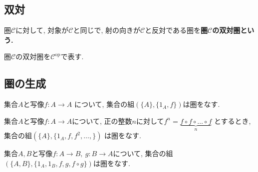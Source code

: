 \subsection{双対}
\begin{Def}
圏$\mathscr{C}$に対して, 対象が$\mathscr{C}$と同じで, 射の向きが$\mathscr{C}$と反対である圏を\bf{圏$\mathscr{C}$の双対圏}という.
\end{Def}
\begin{Notation}
圏$\mathscr{C}$の双対圏を$\mathscr{C}^{\mathrm{op}}$で表す.
\end{Notation}
\begin{comment}
\begin{caution}
双対の原理
\end{caution}
\end{comment}
\subsection{圏の生成}
\begin{Prop}
集合$A$と写像$f:A\rightarrow A$
について, 集合の組$(\{A\},\{1_A,f\})$は圏をなす.
\end{Prop}
\begin{comment}
\begin{proof}
$\mathrm{dom} f=\mathrm{cod}f$であるから, 合成射$f\circ f$を定めることができる.
このとき$f\circ f=1_A$もしくは$f\circ f=f$である.

$f\circ f=1_A$ならば...

...

となる.
一方, $f\circ f=1_A$ならば...

...

となる.
以上より, いずれの場合も, 射の合成が結合律を満たすことがわかる.
したがって$f\circ f=1_A$と定めても$f\circ f=f$と定めても圏を生成することができる.
\end{proof}
\end{comment}
\begin{Prop}
集合$A$と写像$f:A\rightarrow A$について, 正の整数$n$に対して$f^n=\underbrace{f\circ f \circ \dots \circ f}_{n}$
とするとき,
集合の組$(\{A\},\{1_A,f,f^2,\dots,\})$
は圏をなす.
\end{Prop}
\begin{comment}
\begin{proof}
\end{proof}
\end{comment}
\begin{Prop}
集合$A,B$と写像$f:A\rightarrow B,\ g:B\rightarrow A$について,
集合の組$(\{A,B\}, \{1_A,1_B,f,g,f\circ g\})$は圏をなす.
\end{Prop}
